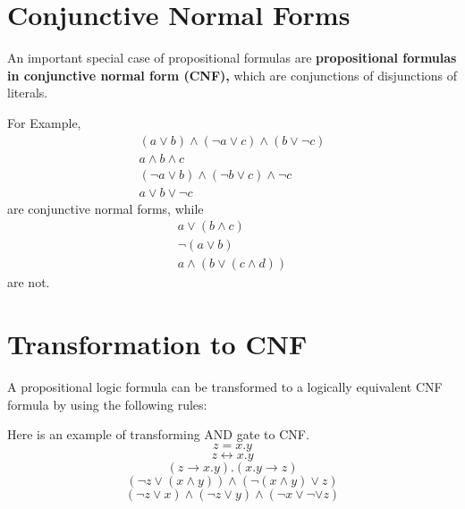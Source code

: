 \documentclass[12pt]{book}
\begin{document}
\section{Conjunctive Normal Forms}
\label{sec:Conjunctive Normal Forms}

\begin{defi}\label{def:CNF}
      An important special case of propositional formulas are \textbf{propositional formulas in conjunctive normal form (CNF),} which are
      conjunctions of disjunctions of literals.  
\end{defi}

\begin{examp}\label{exp:cnf}
      For Example, \begin{eqnarray*}
      &(a\vee b) \wedge (\neg a \vee c) \wedge (b\vee \neg c)& \\
      &a\wedge b \wedge c& \\
      &(\neg a \vee b) \wedge (\neg b \vee c) \wedge \neg c& \\
      &a \vee b \vee \neg c&
\end{eqnarray*} 
are conjunctive normal forms, while
\begin{eqnarray*}
      &a\vee (b \wedge c)&\\
      &\neg(a\vee b)& \\
      &a \wedge (b\vee (c\wedge d))&
\end{eqnarray*}
are not. 
\end{examp}
\section{Transformation to CNF}
\label{sec:Transformation to CNF}

A propositional logic formula can be transformed to a logically equivalent CNF formula by using the following rules:
\begin{enumerate}
      \item $ a = b \Longleftrightarrow a \leftrightarrow b$.
      \item $a \leftrightarrow b \Longleftrightarrow (a \rightarrow b) \wedge (b \rightarrow a)}$.
      \item $ a \rightarrow b \Longleftrightarrow \neg a \vee b$.
	  \item $ a + b \Longleftrightarrow a \vee b$.
	  \item $ a . b \Longleftrightarrow a \wedge b$.
\end{enumerate}
\begin{examp}\label{exp:tocnf}
      Here is an example of transforming AND gate to CNF.
      $$ z = x . y$$
      $$ z  \leftrightarrow x . y$$
      $$(z \rightarrow x . y) . (x . y \rightarrow z)$$
      $$ ( \neg z \vee (x \wedge y)) \wedge (\neg (x \wedge y) \vee z)$$
      $$ (\neg z \vee x) \wedge ( \neg z \vee y) \wedge ( \neg x \vee \neg \vee z)$$
\end{examp}  
\end{document}
